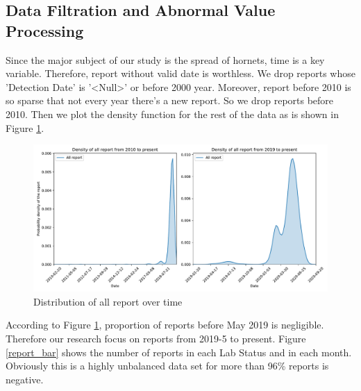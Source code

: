 \documentclass[12pt]{article}
\begin{document}
\subsection{Data Filtration and Abnormal Value Processing}
Since the major subject of our study is the spread of hornets, time is a key variable. Therefore, report without valid date is worthless. We drop reports whose 'Detection Date' is '<Null>' or before 2000 year. Moreover, report before 2010 is so sparse that not every year there's a new report. So we drop reports before 2010. Then we plot the density function for the rest of the data as is shown in {Figure \ref{report_kde}}.
\begin{figure}[H]%
	\small
	\centering
	\includegraphics[width=17cm]{./pictures/report_kdes}
	\caption{Distribution of all report over time}\label{report_kde}
\end{figure}
According to {Figure \ref{report_kde}}, proportion of reports before May 2019 is negligible. Therefore our research focus on reports from 2019-5 to present. {Figure \ref{report_bar}} shows the number of reports in  each Lab Status and in each month. Obviously this is a highly unbalanced data set for more than 96\% reports is negative.
\end{document}
